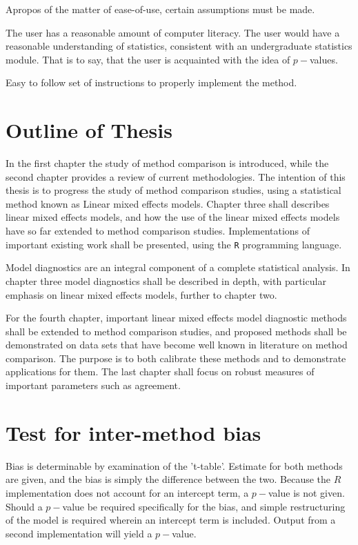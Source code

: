 \documentclass[12pt, a4paper]{report}
\theoremstyle{plain}
\theoremstyle{definition}
\theoremstyle{remark}
\begin{document}









\newpage

Apropos of the matter of ease-of-use, certain assumptions must be made.
	
The user has a reasonable amount of computer literacy. The user would have a reasonable understanding of statistics, consistent with an undergraduate statistics module. That is to say, that the user is acquainted with the idea of $p-$values.
	
Easy to follow set of instructions to properly implement the method.

\section{Outline of Thesis}
In the first chapter the study of method comparison is introduced, while the second chapter provides a review of current methodologies. The intention of this thesis is to progress the
study of method comparison studies, using a statistical method known as Linear mixed effects models.
Chapter three shall describes linear mixed effects models, and how the use of the linear mixed
effects models have so far extended to method comparison studies. Implementations of important existing work shall be presented, using the \texttt{R} programming language.

Model diagnostics are an integral component of a complete statistical analysis.
In chapter three model diagnostics shall be described in depth, with particular
emphasis on linear mixed effects models, further to chapter two.

For the fourth chapter, important linear mixed effects model diagnostic methods shall be extended to method comparison studies, and proposed methods shall be demonstrated on data sets that have become well known in literature on method comparison. The purpose is to both calibrate these methods and to demonstrate applications for them.
The last chapter shall focus on robust measures of important parameters such as agreement.




\section{Test for inter-method bias}
Bias is determinable by examination of the 't-table'. Estimate for both methods are given, and the bias is simply the difference between the two. Because the $R$ implementation does not account for an intercept term, a $p-$value is not given. Should a $p-$value be required specifically for the bias, and simple restructuring of the model is required wherein an intercept term is included. Output from a second implementation will yield a $p-$value.
\end{document}
